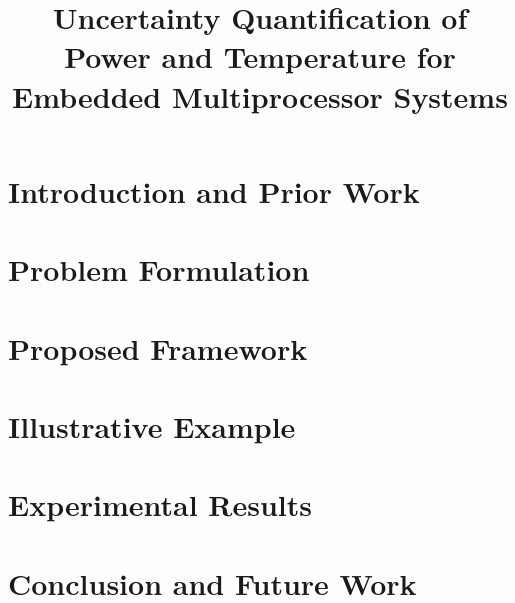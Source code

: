 \documentclass{sig-alternate}
\begin{document}
  \title{Uncertainty Quantification of Power and Temperature for Embedded Multiprocessor Systems}

  \maketitle

  \begin{abstract}
    
  \end{abstract}

  \section{Introduction and Prior Work} 
  

  \section{Problem Formulation}    
  

  \section{Proposed Framework} 
  

  \section{Illustrative Example} 
  

  \section{Experimental Results} 
  

  \section{Conclusion and Future Work} 
  

  \printbibliography

  \appendix
  
\end{document}
